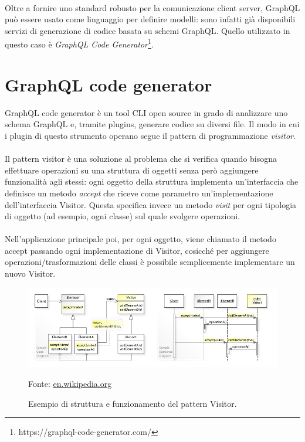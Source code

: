 \documentclass[a4paper, 12pt]{report}
\newcommand{\source}[1]{\caption*{Fonte: {#1}}}
\begin{document}
        \paragraph*{}
          Oltre a fornire uno standard robusto per la comunicazione client server, GraphQL può essere usato come linguaggio per definire modelli: sono infatti già disponibili servizi di generazione di codice basata su schemi GraphQL.
          Quello utilizzato in questo caso è \emph{GraphQL Code Generator}\footnote{https://graphql-code-generator.com/}.
    \section{GraphQL code generator}
      GraphQL code generator è un tool CLI open source in grado di analizzare uno schema GraphQL e, tramite plugins, generare codice su diversi file.
      Il modo in cui i plugin di questo strumento operano segue il pattern di programmazione \emph{visitor}.
      \paragraph*{}
        Il pattern visitor è una soluzione al problema che si verifica quando bisogna effettuare operazioni su una struttura di oggetti senza però aggiungere funzionalità agli stessi:
        ogni oggetto della struttura implementa un'interfaccia che definisce un metodo \emph{accept} che riceve come parametro un'implementazione dell'interfaccia Visitor.
        Questa specifica invece un metodo \emph{visit} per ogni tipologia di oggetto (ad esempio, ogni classe) sul quale svolgere operazioni.
      \paragraph*{}
        Nell'applicazione principale poi, per ogni oggetto, viene chiamato il metodo accept passando ogni implementazione di Visitor, cosicché per aggiungere operazioni/trasformazioni delle classi è possibile semplicemente implementare un nuovo Visitor.
      \begin{figure}[H]
          \includegraphics[width=\textwidth]{visitor-example.jpg}
          \caption{Esempio di struttura e funzionamento del pattern Visitor.}
          \source{\href{https://en.wikipedia.org/wiki/Visitor_pattern}{en.wikipedia.org}}
      \end{figure}
\end{document}
